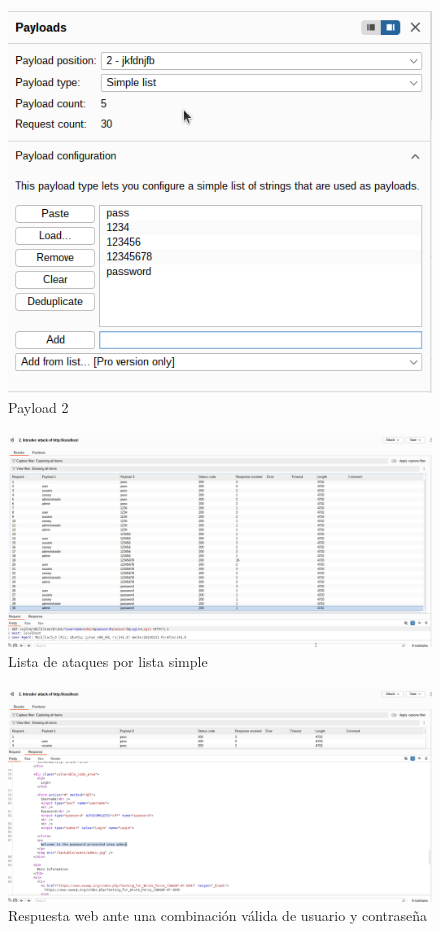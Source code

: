 \documentclass[letterpaper,12pt]{article}
\begin{document}
\begin{figure}
    \centering
    \includegraphics[width=1\linewidth]{identificaryobtenercamposburp/Captura desde 2025-10-01 23-25-58.png}
    \caption{Payload 2}
    \label{fig:payload2}
\end{figure}
\begin{figure}
    \centering
    \includegraphics[width=1\linewidth]{identificaryobtenercamposburp/Captura desde 2025-10-01 23-26-54.png}
    \caption{Lista de ataques por lista simple}
    \label{fig:ataqueslistasimple}
\end{figure}
\begin{figure}
    \centering
    \includegraphics[width=1\linewidth]{identificaryobtenercamposburp/Captura desde 2025-10-01 23-27-12.png}
    \caption{Respuesta web ante una combinación válida de usuario y contraseña}
    \label{fig:intrudersuccesfulattack}
\end{figure}
\end{document}
